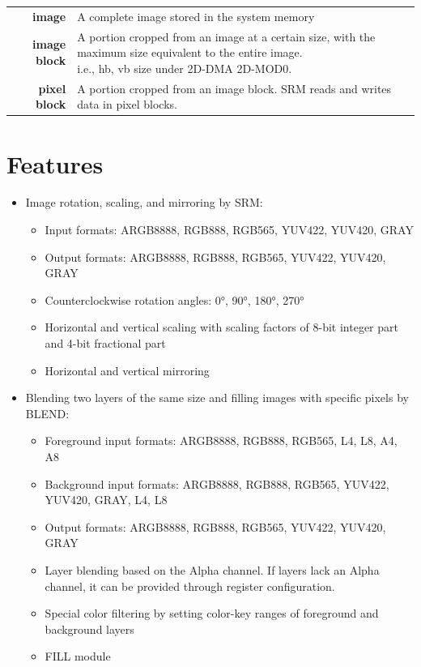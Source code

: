 \documentclass[main\_\_EN.tex]{subfiles}
\begin{document}
\begin{longtable}[c]{ r l }
     \textbf{image} & A complete image stored in the system memory \\
     \textbf{image block} & \makecell[l]{A portion cropped from an image at a certain size, with the maximum size equivalent to the entire image.\\i.e., hb, vb size under 2D-DMA 2D-MOD0.} \\
     \textbf{pixel block} & A portion cropped from an image block. SRM reads and writes data in pixel blocks. \\
\end{longtable}



\section{Features}

\begin{itemize}
    \item Image rotation, scaling, and mirroring by SRM:
        \begin{itemize}
            \item Input formats: ARGB8888, RGB888, RGB565, YUV422, YUV420, GRAY
            \item Output formats: ARGB8888, RGB888, RGB565, YUV422, YUV420, GRAY
            \item Counterclockwise rotation angles: 0°, 90°, 180°, 270°
            \item Horizontal and vertical scaling with scaling factors of 8-bit integer part and 4-bit fractional part
            \item Horizontal and vertical mirroring
        \end{itemize}
    \item Blending two layers of the same size and filling images with specific pixels by BLEND:
        \begin{itemize}
            \item Foreground input formats: ARGB8888, RGB888, RGB565, L4, L8, A4, A8
            \item Background input formats: ARGB8888, RGB888, RGB565, YUV422, YUV420, GRAY, L4, L8
            \item Output formats: ARGB8888, RGB888, RGB565, YUV422, YUV420, GRAY
            \item Layer blending based on the Alpha channel. If layers lack an Alpha channel, it can be provided through register configuration.
            \item Special color filtering by setting color-key ranges of foreground and background layers
            \item FILL module
        \end{itemize}
\end{itemize}
\end{document}

